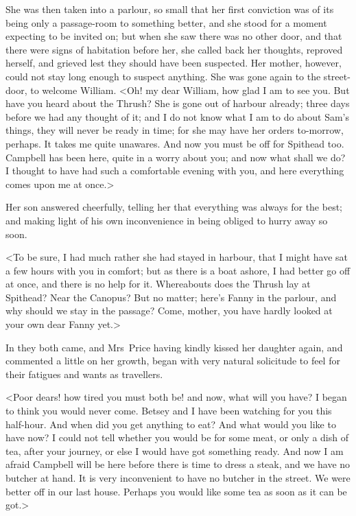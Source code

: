 She was then taken into a parlour, so small that her first conviction was of its being only a passage-room to something better, and she stood for a moment expecting to be invited on; but when she saw there was no other door, and that there were signs of habitation before her, she called back her thoughts, reproved herself, and grieved lest they should have been suspected. Her mother, however, could not stay long enough to suspect anything. She was gone again to the street-door, to welcome William. <Oh! my dear William, how glad I am to see you. But have you heard about the Thrush? She is gone out of harbour already; three days before we had any thought of it; and I do not know what I am to do about Sam's things, they will never be ready in time; for she may have her orders to-morrow, perhaps. It takes me quite unawares. And now you must be off for Spithead too. Campbell has been here, quite in a worry about you; and now what shall we do? I thought to have had such a comfortable evening with you, and here everything comes upon me at once.>

Her son answered cheerfully, telling her that everything was always for the best; and making light of his own inconvenience in being obliged to hurry away so soon.

<To be sure, I had much rather she had stayed in harbour, that I might have sat a few hours with you in comfort; but as there is a boat ashore, I had better go off at once, and there is no help for it. Whereabouts does the Thrush lay at Spithead? Near the Canopus? But no matter; here's Fanny in the parlour, and why should we stay in the passage? Come, mother, you have hardly looked at your own dear Fanny yet.>

In they both came, and Mrs~Price having kindly kissed her daughter again, and commented a little on her growth, began with very natural solicitude to feel for their fatigues and wants as travellers.

<Poor dears! how tired you must both be! and now, what will you have? I began to think you would never come. Betsey and I have been watching for you this half-hour. And when did you get anything to eat? And what would you like to have now? I could not tell whether you would be for some meat, or only a dish of tea, after your journey, or else I would have got something ready. And now I am afraid Campbell will be here before there is time to dress a steak, and we have no butcher at hand. It is very inconvenient to have no butcher in the street. We were better off in our last house. Perhaps you would like some tea as soon as it can be got.>

